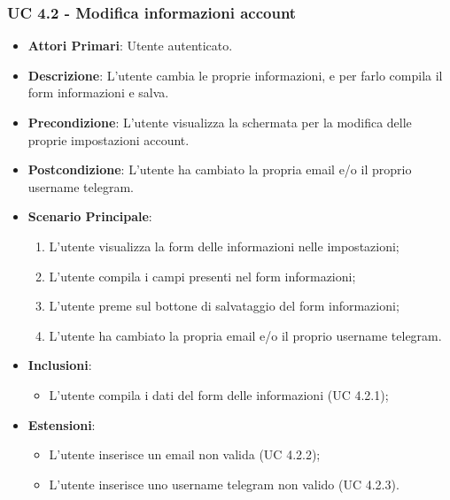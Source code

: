 			\subsubsection{UC 4.2 - Modifica informazioni account}
			\begin{itemize}
				\item \textbf{Attori Primari}: Utente autenticato.
				\item \textbf{Descrizione}: L'utente cambia le proprie informazioni, e per farlo compila il form informazioni e salva.
				\item \textbf{Precondizione}: L'utente visualizza la schermata per la modifica delle proprie impostazioni account.
				\item \textbf{Postcondizione}: L'utente ha cambiato la propria email e/o il proprio username telegram.
				\item \textbf{Scenario Principale}:
				\begin{enumerate}
					\item{L'utente visualizza la form delle informazioni nelle impostazioni;}
					\item{L'utente compila i campi presenti nel form informazioni;}
					\item{L'utente preme sul bottone di salvataggio del form informazioni;}
					\item{L'utente ha cambiato la propria email e/o il proprio username telegram.}
				\end{enumerate}	
				\item \textbf{Inclusioni}:
					\begin{itemize}
						\item L'utente compila i dati del form delle informazioni (UC 4.2.1);
					\end{itemize}
				\item \textbf{Estensioni}:
					\begin{itemize}
						\item L'utente inserisce un email non valida (UC 4.2.2);
						\item L'utente inserisce uno username telegram non valido (UC 4.2.3).
					\end{itemize}
			\end{itemize}

